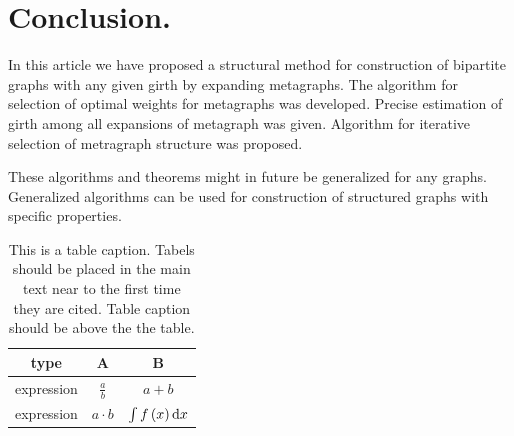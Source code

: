 \documentclass[leqno]{aadmbook}
\begin{document}
\section{Conclusion.}


In this article we have proposed a structural method for construction of bipartite graphs with any given girth by expanding metagraphs. The algorithm for selection of optimal weights for metagraphs was developed. Precise estimation of girth among all expansions of metagraph was given. Algorithm for iterative selection of metragraph structure was proposed.

These algorithms and theorems might in future be generalized for any graphs. Generalized algorithms can be used for construction of structured graphs with specific properties.

\begin{table}[H]
\caption{This is a table caption. Tabels should be placed in the main text
near to the first time they are cited. Table caption should be above
the the table.}

\centering{}%
\begin{tabular}{|c|c|c|}
\hline 
type & A & B\tabularnewline
\hline 
\hline 
expression & $\frac{a}{b}$ & $a+b$\tabularnewline
\hline 
expression & $a\cdot b$ & $\int f\left(x\right){\rm d}x$\tabularnewline
\hline 
\end{tabular}
\end{table}
\end{document}
